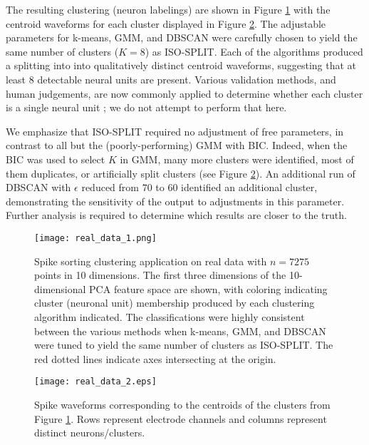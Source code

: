 \documentclass[10pt]{article}
\begin{document}
The resulting clustering (neuron labelings) are shown in Figure \ref{fig:real_data_1} with the centroid waveforms for each cluster displayed in Figure \ref{fig:real_data_2}. The adjustable parameters for k-means, GMM, and DBSCAN were carefully chosen to yield the same number of clusters ($K=8$) as ISO-SPLIT. Each of the algorithms produced a splitting into into qualitatively distinct centroid waveforms, suggesting that at least 8 detectable neural units are present. Various validation methods, and human judgements, are now commonly applied to determine whether each cluster is a single neural unit \citep[e.g.][]{Hill2011,validspike}; we do not attempt to perform that here.

We emphasize that ISO-SPLIT required no adjustment of free parameters, in contrast to all but the (poorly-performing) GMM with BIC. Indeed, when the BIC was used to select $K$ in GMM, many more clusters were identified, most of them duplicates, or artificially split clusters (see Figure \ref{fig:real_data_2}). An additional run of DBSCAN with $\epsilon$ reduced from $70$ to $60$ identified an additional cluster, demonstrating the sensitivity of the output to adjustments in this parameter. Further analysis is required to determine which results are closer to the truth.

\begin{figure}
\begin{center}
\texttt{[image: real\_data\_1.png]}
\end{center}
\caption{
  Spike sorting clustering application on real data with $n=7275$ points in 10 dimensions. The first three dimensions of the 10-dimensional PCA feature space are shown, with coloring indicating cluster (neuronal unit) membership produced by each clustering algorithm indicated. The classifications were highly consistent between the various methods when k-means, GMM, and DBSCAN were tuned to yield the same number of clusters as ISO-SPLIT.
  The red dotted lines indicate axes intersecting at the origin.
}
\label{fig:real_data_1}
\end{figure}

\begin{figure}
\begin{center}
\texttt{[image: real\_data\_2.eps]}
\end{center}
\caption{
Spike waveforms corresponding to the centroids of the clusters from Figure \ref{fig:real_data_1}. Rows represent electrode channels and columns represent distinct neurons/clusters.
}
\label{fig:real_data_2}
\end{figure}
\end{document}
